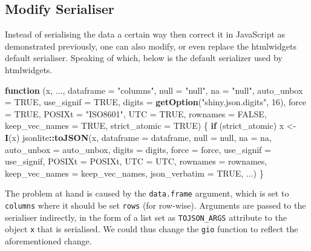 \documentclass[10pt,]{krantz}
\makeatletter
\newenvironment{Shaded}{\begin{snugshade}}{\end{snugshade}}
\newcommand{\ControlFlowTok}[1]{\textcolor[rgb]{0.27,0.27,0.27}{\textbf{#1}}}
\newcommand{\DataTypeTok}[1]{\textcolor[rgb]{0.27,0.27,0.27}{#1}}
\newcommand{\DecValTok}[1]{\textcolor[rgb]{0.06,0.06,0.06}{#1}}
\newcommand{\KeywordTok}[1]{\textcolor[rgb]{0.27,0.27,0.27}{\textbf{#1}}}
\newcommand{\NormalTok}[1]{#1}
\newcommand{\OperatorTok}[1]{\textcolor[rgb]{0.43,0.43,0.43}{\textbf{#1}}}
\newcommand{\OtherTok}[1]{\textcolor[rgb]{0.37,0.37,0.37}{#1}}
\newcommand{\StringTok}[1]{\textcolor[rgb]{0.5,0.5,0.5}{#1}}
\newenvironment{kframe}{%
\medskip{}
\setlength{\fboxsep}{.8em}
 \def\at@end@of@kframe{}%
 \ifinner\ifhmode%
  \def\at@end@of@kframe{\end{minipage}}%
  \begin{minipage}{\columnwidth}%
 \fi\fi%
 \def\FrameCommand##1{\hskip\@totalleftmargin \hskip-\fboxsep
 \colorbox{shadecolor}{##1}\hskip-\fboxsep
     \hskip-\linewidth \hskip-\@totalleftmargin \hskip\columnwidth}%
 \MakeFramed {\advance\hsize-\width
   \@totalleftmargin\z@ \linewidth\hsize
   \@setminipage}}%
 {\par\unskip\endMakeFramed%
 \at@end@of@kframe}
\renewenvironment{Shaded}{\begin{kframe}}{\end{kframe}}
\makeatother
\begin{document}
\hypertarget{widgets-full-transform-data-modify}{%
\subsection{Modify Serialiser}\label{widgets-full-transform-data-modify}}

Instead of serialising the data a certain way then correct it in JavaScript as demonstrated previously, one can also modify, or even replace the htmlwidgets default serialiser. Speaking of which, below is the default serializer used by htmlwidgets.

\begin{Shaded}
\begin{Highlighting}[]
\ControlFlowTok{function}\NormalTok{ (x, ..., }\DataTypeTok{dataframe =} \StringTok{"columns"}\NormalTok{, }\DataTypeTok{null =} \StringTok{"null"}\NormalTok{, }
\DataTypeTok{na =} \StringTok{"null"}\NormalTok{, }\DataTypeTok{auto_unbox =} \OtherTok{TRUE}\NormalTok{, }\DataTypeTok{use_signif =} \OtherTok{TRUE}\NormalTok{, }
  \DataTypeTok{digits =} \KeywordTok{getOption}\NormalTok{(}\StringTok{"shiny.json.digits"}\NormalTok{, }\DecValTok{16}\NormalTok{), }\DataTypeTok{force =} \OtherTok{TRUE}\NormalTok{,}
  \DataTypeTok{POSIXt =} \StringTok{"ISO8601"}\NormalTok{, }\DataTypeTok{UTC =} \OtherTok{TRUE}\NormalTok{, }\DataTypeTok{rownames =} \OtherTok{FALSE}\NormalTok{, }
  \DataTypeTok{keep_vec_names =} \OtherTok{TRUE}\NormalTok{, }\DataTypeTok{strict_atomic =} \OtherTok{TRUE}\NormalTok{) }
\NormalTok{\{}
  \ControlFlowTok{if}\NormalTok{ (strict_atomic) }
\NormalTok{      x <-}\StringTok{ }\KeywordTok{I}\NormalTok{(x)}
\NormalTok{  jsonlite}\OperatorTok{::}\KeywordTok{toJSON}\NormalTok{(x, }\DataTypeTok{dataframe =}\NormalTok{ dataframe, }\DataTypeTok{null =}\NormalTok{ null, }\DataTypeTok{na =}\NormalTok{ na, }
    \DataTypeTok{auto_unbox =}\NormalTok{ auto_unbox, }\DataTypeTok{digits =}\NormalTok{ digits, }\DataTypeTok{force =}\NormalTok{ force, }
    \DataTypeTok{use_signif =}\NormalTok{ use_signif, }\DataTypeTok{POSIXt =}\NormalTok{ POSIXt, }\DataTypeTok{UTC =}\NormalTok{ UTC, }
    \DataTypeTok{rownames =}\NormalTok{ rownames, }\DataTypeTok{keep_vec_names =}\NormalTok{ keep_vec_names, }
    \DataTypeTok{json_verbatim =} \OtherTok{TRUE}\NormalTok{, ...)}
\NormalTok{\}}
\end{Highlighting}
\end{Shaded}

The problem at hand is caused by the \texttt{data.frame} argument, which is set to \texttt{columns} where it should be set \texttt{rows} (for row-wise). Arguments are passed to the serialiser indirectly, in the form of a list set as \texttt{TOJSON\_ARGS} attribute to the object \texttt{x} that is serialised. We could thus change the \texttt{gio} function to reflect the aforementioned change.
\end{document}
